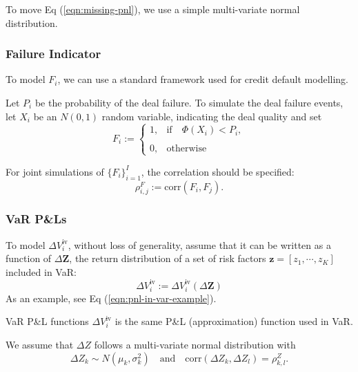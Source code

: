\documentclass[10pt,a4paper]{article}
\newcommand{\inVaR}{{\mathrm{iv}}}
\begin{document}
To move Eq (\ref{eqn:missing-pnl}), we use a simple multi-variate normal distribution.

\subsubsection{Failure Indicator}
To model $F_i$, we can use a standard framework used for credit default modelling. 

Let $P_i$ be the probability of the deal failure. To simulate the deal failure events, let $X_i$ be an $N(0,1)$ random variable, indicating the deal quality and set
\begin{equation}
F_i := \left\{
\begin{array}{cl}
1, & \textrm{if}\quad \Phi(X_i) < P_i,\\
\\
0, & \textrm{otherwise} 
\end{array}
\right.
\end{equation}

For joint simulations of $\{F_i\}_{i=1}^{I}$, the correlation should be specified:
\begin{equation} 
\rho^F_{i,j} := \mathrm{corr}(F_i, F_j).
\end{equation}



\subsubsection{VaR P\&Ls}

To model $\Delta V_i^\inVaR$, without loss of generality, assume that it can be written as a function of $\Delta \bm{Z}$, the return distribution of a set of risk factors $\bm{z} = [z_1, \cdots, z_K]$ included in VaR:
\begin{equation}
\Delta V_i^\inVaR := \Delta V_i^\inVaR(\Delta \bm{Z})
\end{equation}
As an example, see Eq (\ref{eqn:pnl-in-var-example}). 

\begin{MyRemark}{VaR P\&L functions}{}
$\Delta V_i^\inVaR$ is the same P\&L (approximation) function used in VaR.
\end{MyRemark}

We assume that $\Delta Z$ follows a multi-variate normal distribution with
\begin{equation}
\Delta Z_k \sim N(\mu_k, \sigma_k^2) \quad \textrm{and} \quad \mathrm{corr}(\Delta Z_k, \Delta Z_l) = \rho_{k,l}^{Z}.
\end{equation}
\end{document}
